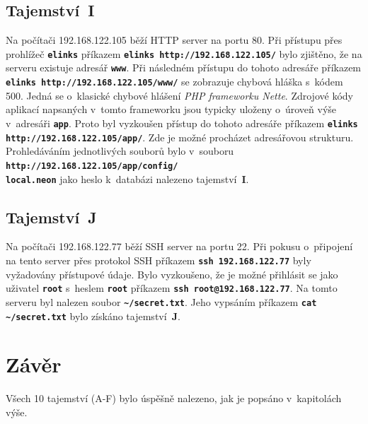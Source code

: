 \documentclass[a4paper, 10pt, twocolumn]{article}
\renewcommand{\tt}[1]{\texttt{\textbf{#1}}}
\begin{document}
	\subsection{Tajemství~I}

	Na počítači 192.168.122.105 běží HTTP server na portu 80. Při
	přístupu přes prohlížeč \tt{elinks} příkazem \tt{elinks
	http://192.168.122.105/} bylo zjištěno, že na serveru existuje
	adresář \tt{www}. Při následném přístupu do tohoto adresáře
	příkazem \tt{elinks http://192.168.122.105/www/} se zobrazuje
	chybová hláška s~kódem 500. Jedná se o~klasické chybové hlášení
	\textit{PHP frameworku Nette}. Zdrojové kódy aplikací napsaných
	v~tomto frameworku jsou typicky uloženy o~úroveň výše v~adresáři
	\tt{app}. Proto byl vyzkoušen přístup do tohoto adresáře příkazem
	\tt{elinks http://192.168.122.105/app/}. Zde je možné procházet
	adresářovou strukturu. Prohledáváním jednotlivých souborů bylo
	v~souboru \tt{http://192.168.122.105/app/config/\\local.neon} jako
	heslo k~databázi nalezeno tajemství~\textbf{I}.

	\subsection{Tajemství~J}

	Na počítači 192.168.122.77 běží SSH server na portu 22. Při pokusu
	o~připojení na tento server přes protokol SSH příkazem \tt{ssh
	192.168.122.77} byly vyžadovány přístupové údaje. Bylo vyzkoušeno,
	že je možné přihlásit se jako uživatel \tt{root} s~heslem \tt{root}
	příkazem \tt{ssh root@192.168.122.77}. Na tomto serveru byl
	nalezen soubor \tt{\textasciitilde/secret.txt}. Jeho vypsáním 
	příkazem \tt{cat \textasciitilde/secret.txt} bylo získáno
	tajemství~\textbf{J}.


	\section{Závěr}

	Všech 10 tajemství (A-F) bylo úspěšně nalezeno, jak je popsáno
	v~kapitolách výše.
\end{document}
